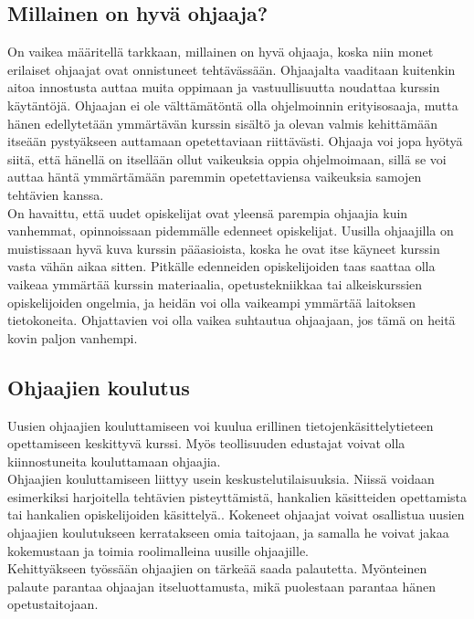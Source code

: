 \documentclass[finnish]{tktltiki2}
\theoremstyle{definition}
\theoremstyle{remark}
\begin{document}
\subsection{Millainen on hyvä ohjaaja?}
On vaikea määritellä tarkkaan, millainen on hyvä ohjaaja, koska niin monet erilaiset ohjaajat ovat onnistuneet tehtävässään. Ohjaajalta vaaditaan kuitenkin aitoa innostusta auttaa muita oppimaan ja vastuullisuutta noudattaa kurssin käytäntöjä. Ohjaajan ei ole välttämätöntä olla ohjelmoinnin erityisosaaja, mutta hänen edellytetään ymmärtävän kurssin sisältö ja olevan valmis kehittämään itseään pystyäkseen auttamaan opetettaviaan riittävästi.\cite{Reges88} Ohjaaja voi jopa hyötyä siitä, että hänellä on itsellään ollut vaikeuksia oppia ohjelmoimaan, sillä se voi auttaa häntä ymmärtämään paremmin opetettaviensa vaikeuksia samojen tehtävien kanssa.\cite{Decker06}
\\
On havaittu, että uudet opiskelijat ovat yleensä parempia ohjaajia kuin vanhemmat, opinnoissaan pidemmälle edenneet opiskelijat. Uusilla ohjaajilla on muistissaan hyvä kuva kurssin pääasioista, koska he ovat itse käyneet kurssin vasta vähän aikaa sitten.\cite{Dickson11} Pitkälle edenneiden opiskelijoiden taas saattaa olla vaikeaa ymmärtää kurssin materiaalia, opetustekniikkaa tai alkeiskurssien opiskelijoiden ongelmia, ja heidän voi olla vaikeampi ymmärtää laitoksen tietokoneita.\cite{Reges88} Ohjattavien voi olla vaikea suhtautua ohjaajaan, jos tämä on heitä kovin paljon vanhempi.\cite{Decker06}



\subsection{Ohjaajien koulutus}

Uusien ohjaajien kouluttamiseen voi kuulua erillinen tietojenkäsittelytieteen opettamiseen keskittyvä kurssi.\cite{Reges88, Roberts95} Myös teollisuuden edustajat voivat olla kiinnostuneita kouluttamaan ohjaajia.\cite{Morgan02}
\\
Ohjaajien kouluttamiseen liittyy usein keskustelutilaisuuksia. Niissä voidaan esimerkiksi harjoitella tehtävien pisteyttämistä, hankalien käsitteiden opettamista tai hankalien opiskelijoiden käsittelyä.\cite{Reges03}. Kokeneet ohjaajat voivat osallistua uusien ohjaajien koulutukseen kerratakseen omia taitojaan, ja samalla he voivat jakaa kokemustaan ja toimia roolimalleina uusille ohjaajille.\cite{Reges88} 
\\
Kehittyäkseen työssään ohjaajien on tärkeää saada palautetta.\cite{Patitsas12} Myönteinen palaute parantaa ohjaajan itseluottamusta, mikä puolestaan parantaa hänen opetustaitojaan.
\end{document}
